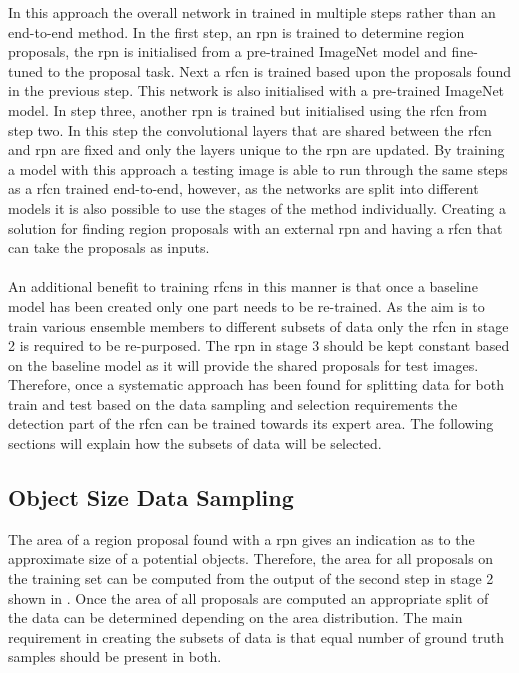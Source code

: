 In this approach the overall network in trained in multiple steps rather than an end-to-end method. In the first step, an \gls{rpn} is trained to determine region proposals, the \gls{rpn} is initialised from a pre-trained ImageNet model and fine-tuned to the proposal task. Next a \gls{rfcn} is trained based upon the proposals found in the previous step. This network is also initialised with a pre-trained ImageNet model. In step three, another \gls{rpn} is trained but initialised using the \gls{rfcn} from step two. In this step the convolutional layers that are shared between the \gls{rfcn} and \gls{rpn} are fixed and only the layers unique to the \gls{rpn} are updated. By training a model with this approach a testing image is able to run through the same steps as a \gls{rfcn} trained end-to-end, however, as the networks are split into different models it is also possible to use the stages of the method individually. Creating a solution for finding region proposals with an external \gls{rpn} and having a \gls{rfcn} that can take the proposals as inputs. 
\\\\
An additional benefit to training \glspl{rfcn} in this manner is that once a baseline model has been created only one part needs to be re-trained. As the aim is to train various ensemble members to different subsets of data only the \gls{rfcn} in stage 2 is required to be re-purposed. The \gls{rpn} in stage 3 should be kept constant based on the baseline model as it will provide the shared proposals for test images. Therefore, once a systematic approach has been found for splitting data for both train and test based on the data sampling and selection requirements the detection part of the \gls{rfcn} can be trained towards its expert area. The following sections will explain how the subsets of data will be selected.

\subsection{Object Size Data Sampling}
The area of a region proposal found with a \gls{rpn} gives an indication as to the approximate size of a potential objects. Therefore, the area for all proposals on the training set can be computed from the output of the second step in stage 2 shown in . Once the area of all proposals are computed an appropriate split of the data can be determined depending on the area distribution. The main requirement in creating the subsets of data is that equal number of ground truth samples should be present in both.


